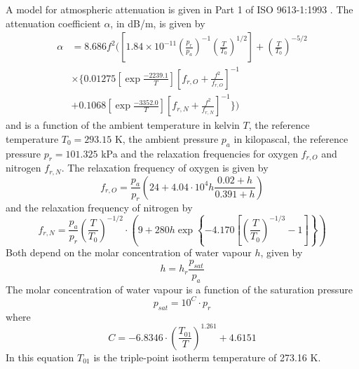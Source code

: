 A model for atmospheric attenuation is given in Part 1 of ISO 9613-1:1993 \cite{ISO9613-1}.
The attenuation coefficient $\alpha$, in dB/m, is given by
\begin{align}\label{eq:theory:sound:atmospheric-attenuation}
 \alpha &= 8.686 f^2 \Biggl( \left[ 1.84 \times 10^{-11} \left(\frac{p_r}{p_a}\right)^{-1} \left(\frac{T}{T_0}\right)^{1/2} \right] + \left(\frac{T}{T_0}\right)^{-5/2} \nonumber \\
 &\times \Biggl\{ 0.01275 \left[ \exp{\frac{-2239.1}{T}} \right]  \left[f_{r,O} + \frac{f^2}{f_{r,O}} \right]^{-1} \nonumber \\
 &+ 0.1068 \left[ \exp{\frac{-3352.0}{T}} \right] \left[ f_{r,N} + \frac{f^2}{f_{r,N}} \right]^{-1} \Biggr\} \Biggr)
\end{align}
and is a function of the ambient temperature in kelvin $T$, the reference
temperature $T_0=293.15$ K, the ambient pressure $p_a$ in kilopascal, the
reference pressure $p_r=101.325$ kPa and the relaxation frequencies for oxygen
$f_{r,O}$ and nitrogen $f_{r,N}$.
The relaxation frequency of oxygen is given by
\begin{equation}
 f_{r,O} = \frac{p_a}{p_r} \left( 24 + 4.04 \cdot 10^4 h \frac{0.02 + h}{0.391 + h}  \right)
\end{equation}
and the relaxation frequency of nitrogen by
\begin{equation}
 f_{r,N} = \frac{p_a}{p_r} \left( \frac{T}{T_0} \right)^{-1/2} \cdot \left( 9 + 280 h \exp{\left\{ -4.170 \left[ \left(\frac{T}{T_0} \right)^{-1/3} -1 \right] \right\} } \right)
\end{equation}
Both depend on the molar concentration of water vapour $h$, given by
\begin{equation}
 h = h_r  \frac{p_{sat}}{p_a}
\end{equation}
The molar concentration of water vapour is a function of the saturation pressure
\begin{equation}
 p_{sat} = 10^C \cdot p_r
\end{equation}
where
\begin{equation}
 C = -6.8346 \cdot \left( \frac{T_{01}}{T} \right)^{1.261}  + 4.6151
\end{equation}
In this equation $T_{01}$ is the triple-point isotherm temperature of 273.16 K.


